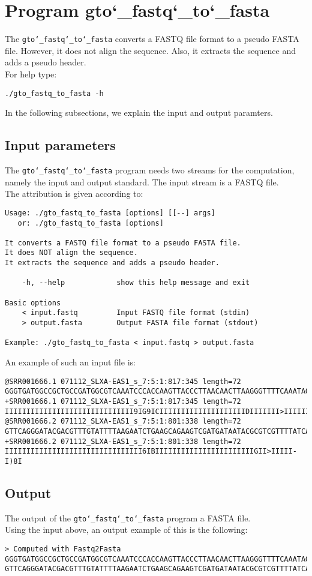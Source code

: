 \section{Program gto\char`_fastq\char`_to\char`_fasta}
The \texttt{gto\char`_fastq\char`_to\char`_fasta} converts a FASTQ file format to a pseudo FASTA file. However, it does not align the sequence. Also, it extracts the sequence and adds a pseudo header.\\
For help type:
\begin{lstlisting}
./gto_fastq_to_fasta -h
\end{lstlisting}
In the following subsections, we explain the input and output paramters.

\subsection*{Input parameters}

The \texttt{gto\char`_fastq\char`_to\char`_fasta} program needs two streams for the computation, namely the input and output standard. The input stream is a FASTQ file.\\
The attribution is given according to:
\begin{lstlisting}
Usage: ./gto_fastq_to_fasta [options] [[--] args]
   or: ./gto_fastq_to_fasta [options]

It converts a FASTQ file format to a pseudo FASTA file.
It does NOT align the sequence.
It extracts the sequence and adds a pseudo header.

    -h, --help            show this help message and exit

Basic options
    < input.fastq         Input FASTQ file format (stdin)
    > output.fasta        Output FASTA file format (stdout)

Example: ./gto_fastq_to_fasta < input.fastq > output.fasta
\end{lstlisting}
An example of such an input file is:
\begin{lstlisting}
@SRR001666.1 071112_SLXA-EAS1_s_7:5:1:817:345 length=72
GGGTGATGGCCGCTGCCGATGGCGTCAAATCCCACCAAGTTACCCTTAACAACTTAAGGGTTTTCAAATAGA
+SRR001666.1 071112_SLXA-EAS1_s_7:5:1:817:345 length=72
IIIIIIIIIIIIIIIIIIIIIIIIIIIIII9IG9ICIIIIIIIIIIIIIIIIIIIIDIIIIIII>IIIIII/
@SRR001666.2 071112_SLXA-EAS1_s_7:5:1:801:338 length=72
GTTCAGGGATACGACGTTTGTATTTTAAGAATCTGAAGCAGAAGTCGATGATAATACGCGTCGTTTTATCAT
+SRR001666.2 071112_SLXA-EAS1_s_7:5:1:801:338 length=72
IIIIIIIIIIIIIIIIIIIIIIIIIIIIIIII6IBIIIIIIIIIIIIIIIIIIIIIIIGII>IIIII-I)8I
\end{lstlisting}

\subsection*{Output}
The output of the \texttt{gto\char`_fastq\char`_to\char`_fasta} program a FASTA file.\\
Using the input above, an output example of this is the following:
\begin{lstlisting}
> Computed with Fastq2Fasta
GGGTGATGGCCGCTGCCGATGGCGTCAAATCCCACCAAGTTACCCTTAACAACTTAAGGGTTTTCAAATAGA
GTTCAGGGATACGACGTTTGTATTTTAAGAATCTGAAGCAGAAGTCGATGATAATACGCGTCGTTTTATCAT
\end{lstlisting}
